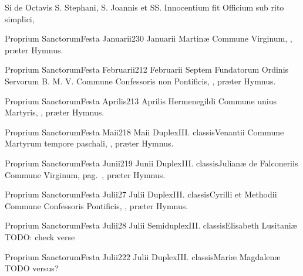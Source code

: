 \documentclass[psalterium-tridentinum.tex]{subfiles}
\begin{document}
Si de Octavis S. Stephani, S. Joannis et SS. Innocentium fit Officium sub rito simplici, %


	{Proprium Sanctorum}{Festa Januarii}{2}{30 Januarii}
	{}{}{Martinæ}
	{Commune Virginum, \pageref{M-MU}, præter Hymnus.}
	{}

	{Proprium Sanctorum}{Festa Februarii}{2}{12 Februarii}
	{}{}{Septem Fundatorum Ordinis Servorum B. M. V.}
	{Commune Confessoris non Pontificis, \pageref{M-CONP}, præter Hymnus.}
	{}

	{Proprium Sanctorum}{Festa Aprilis}{2}{13 Aprilis}
	{}{}{Hermenegildi}
	{Commune unius Martyris, \pageref{M-UMEX}, præter Hymnus.}
	{}

	{Proprium Sanctorum}{Festa Maii}{2}{18 Maii}
	{Duplex}{III. classis}{Venantii}
	{Commune Martyrum tempore paschali, \pageref{M-MRTP}, præter Hymnus.}
	{}

	{Proprium Sanctorum}{Festa Junii}{2}{19 Junii}
	{Duplex}{III. classis}{Julianæ de Falconeriis}
	{Commune Virginum, pag.\ \pageref{M-MU}, præter Hymnus.}
	{}

	{Proprium Sanctorum}{Festa Julii}{2}{7 Julii}
	{Duplex}{III. classis}{Cyrilli et Methodii}
	{Commune Confessoris Pontificis, \pageref{M-COPO}, præter Hymnus.}
	{}

	{Proprium Sanctorum}{Festa Julii}{2}{8 Julii}
	{Semiduplex}{III. classis}{Elisabeth Lusitaniæ}
	{TODO: check verse}
	{}

	{Proprium Sanctorum}{Festa Julii}{2}{22 Julii}
	{Duplex}{III. classis}{Mariæ Magdalenæ}
	{TODO versus?}
	{}
\end{document}
